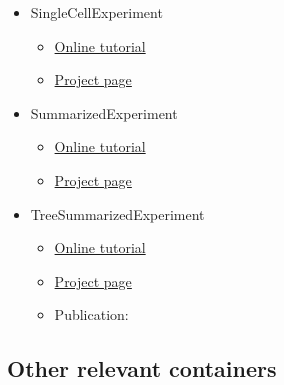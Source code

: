 \documentclass[
]{book}
\providecommand{\tightlist}{%
  \setlength{\itemsep}{0pt}\setlength{\parskip}{0pt}}
\begin{document}
\begin{itemize}
\tightlist
\item
  SingleCellExperiment \citep{R-SingleCellExperiment}

  \begin{itemize}
  \tightlist
  \item
    \href{https://bioconductor.org/packages/release/bioc/vignettes/SingleCellExperiment/inst/doc/intro.html}{Online tutorial}
  \item
    \href{https://bioconductor.org/packages/release/bioc/html/SingleCellExperiment.html}{Project page}
  \end{itemize}
\item
  SummarizedExperiment \citep{R-SummarizedExperiment}

  \begin{itemize}
  \tightlist
  \item
    \href{https://bioconductor.org/packages/release/bioc/vignettes/SummarizedExperiment/inst/doc/SummarizedExperiment.html}{Online tutorial}
  \item
    \href{https://bioconductor.org/packages/release/bioc/html/SummarizedExperiment.html}{Project page}
  \end{itemize}
\item
  TreeSummarizedExperiment \citep{R-TreeSummarizedExperiment}

  \begin{itemize}
  \tightlist
  \item
    \href{https://bioconductor.org/packages/release/bioc/vignettes/TreeSummarizedExperiment/inst/doc/Introduction_to_treeSummarizedExperiment.html}{Online tutorial}
  \item
    \href{https://www.bioconductor.org/packages/release/bioc/html/TreeSummarizedExperiment.html}{Project page}
  \item
    Publication: \citep{Huang2021}
  \end{itemize}
\end{itemize}

\hypertarget{other-relevant-containers}{%
\subsection{Other relevant containers}\label{other-relevant-containers}}
\end{document}

